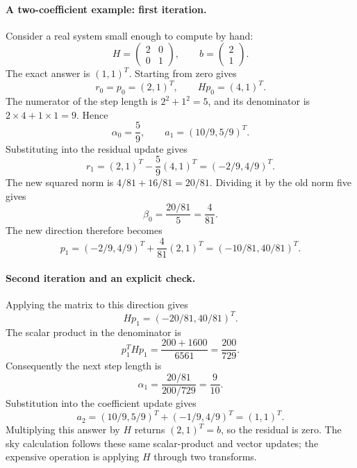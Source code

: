 \paragraph{A two-coefficient example: first iteration.}
Consider a real system small enough to compute by hand:
\begin{equation}
 H=\begin{pmatrix}2&0\\0&1\end{pmatrix},\qquad
 b=\begin{pmatrix}2\\1\end{pmatrix}.
\end{equation}
The exact answer is $(1,1)^T$. Starting from zero gives
\begin{equation}
 r_0=p_0=(2,1)^T,\qquad Hp_0=(4,1)^T.
\end{equation}
The numerator of the step length is $2^2+1^2=5$, and its denominator is
$2\times4+1\times1=9$. Hence
\begin{equation}
 \alpha_0=\frac59,\qquad a_1=(10/9,5/9)^T.
\end{equation}
Substituting into the residual update gives
\begin{equation}
 r_1=(2,1)^T-\frac59(4,1)^T=(-2/9,4/9)^T.
\end{equation}
The new squared norm is $4/81+16/81=20/81$. Dividing it by the old norm
five gives
\begin{equation}
 \beta_0=\frac{20/81}{5}=\frac4{81}.
\end{equation}
The new direction therefore becomes
\begin{equation}
 p_1=(-2/9,4/9)^T+\frac4{81}(2,1)^T=(-10/81,40/81)^T.
\end{equation}

\paragraph{Second iteration and an explicit check.}
Applying the matrix to this direction gives
\begin{equation}
 Hp_1=(-20/81,40/81)^T.
\end{equation}
The scalar product in the denominator is
\begin{equation}
 p_1^THp_1=\frac{200+1600}{6561}=\frac{200}{729}.
\end{equation}
Consequently the next step length is
\begin{equation}
 \alpha_1=\frac{20/81}{200/729}=\frac9{10}.
\end{equation}
Substitution into the coefficient update gives
\begin{equation}
 a_2=(10/9,5/9)^T+(-1/9,4/9)^T=(1,1)^T.
\end{equation}
Multiplying this answer by $H$ returns $(2,1)^T=b$, so the residual is
zero. The sky calculation follows these same scalar-product and vector
updates; the expensive operation is applying $H$ through two transforms.

